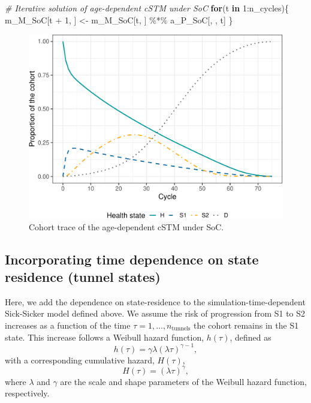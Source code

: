 \documentclass[
]{article}
\newenvironment{Shaded}{\begin{snugshade}}{\end{snugshade}}
\newcommand{\CommentTok}[1]{\textcolor[rgb]{0.56,0.35,0.01}{\textit{#1}}}
\newcommand{\ControlFlowTok}[1]{\textcolor[rgb]{0.13,0.29,0.53}{\textbf{#1}}}
\newcommand{\DecValTok}[1]{\textcolor[rgb]{0.00,0.00,0.81}{#1}}
\newcommand{\NormalTok}[1]{#1}
\newcommand{\OtherTok}[1]{\textcolor[rgb]{0.56,0.35,0.01}{#1}}
\newcommand{\SpecialCharTok}[1]{\textcolor[rgb]{0.00,0.00,0.00}{#1}}
\begin{document}
\begin{Shaded}
\begin{Highlighting}[]
\CommentTok{\# Iterative solution of age{-}dependent cSTM under SoC}
\ControlFlowTok{for}\NormalTok{(t }\ControlFlowTok{in} \DecValTok{1}\SpecialCharTok{:}\NormalTok{n\_cycles)\{}
\NormalTok{  m\_M\_SoC[t }\SpecialCharTok{+} \DecValTok{1}\NormalTok{, ] }\OtherTok{\textless{}{-}}\NormalTok{ m\_M\_SoC[t, ] }\SpecialCharTok{\%*\%}\NormalTok{ a\_P\_SoC[, , t]}
\NormalTok{\}}
\end{Highlighting}
\end{Shaded}

\begin{figure}[H]

{\centering \includegraphics{figs/Sick-Sicker-Trace-AgeDep-1} 

}

\caption{Cohort trace of the age-dependent cSTM under SoC.}\label{fig:Sick-Sicker-Trace-AgeDep}
\end{figure}

\hypertarget{incorporating-time-dependence-on-state-residence-tunnel-states}{%
\subsection{Incorporating time dependence on state residence (tunnel states)}\label{incorporating-time-dependence-on-state-residence-tunnel-states}}

Here, we add the dependence on state-residence to the simulation-time-dependent Sick-Sicker model defined above. We assume the risk of progression from S1 to S2 increases as a function of the time \(\tau = 1, \ldots, n_{\text{tunnels}}\) the cohort remains in the S1 state. This increase follows a Weibull hazard function, \(h(\tau)\), defined as
\[
  h(\tau) = \gamma \lambda (\lambda \tau)^{\gamma-1},
\]
with a corresponding cumulative hazard, \(H(\tau)\),
\begin{equation}
  H(\tau) = (\lambda \tau)^{\gamma},
\label{eq:H-weibull}
\end{equation}
where \(\lambda\) and \(\gamma\) are the scale and shape parameters of the Weibull hazard function, respectively.
\end{document}
